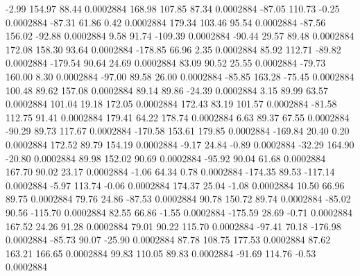        -2.99      154.97       88.44     0.0002884
      168.98      107.85       87.34     0.0002884
      -87.05      110.73       -0.25     0.0002884
      -87.31       61.86        0.42     0.0002884
      179.34      103.46       95.54     0.0002884
      -87.56      156.02      -92.88     0.0002884
        9.58       91.74     -109.39     0.0002884
      -90.44       29.57       89.48     0.0002884
      172.08      158.30       93.64     0.0002884
     -178.85       66.96        2.35     0.0002884
       85.92      112.71      -89.82     0.0002884
     -179.54       90.64       24.69     0.0002884
       83.09       90.52       25.55     0.0002884
      -79.73      160.00        8.30     0.0002884
      -97.00       89.58       26.00     0.0002884
      -85.85      163.28      -75.45     0.0002884
      100.48       89.62      157.08     0.0002884
       89.14       89.86      -24.39     0.0002884
        3.15       89.99       63.57     0.0002884
      101.04       19.18      172.05     0.0002884
      172.43       83.19      101.57     0.0002884
      -81.58      112.75       91.41     0.0002884
      179.41       64.22      178.74     0.0002884
        6.63       89.37       67.55     0.0002884
      -90.29       89.73      117.67     0.0002884
     -170.58      153.61      179.85     0.0002884
     -169.84       20.40        0.20     0.0002884
      172.52       89.79      154.19     0.0002884
       -9.17       24.84       -0.89     0.0002884
      -32.29      164.90      -20.80     0.0002884
       89.98      152.02       90.69     0.0002884
      -95.92       90.04       61.68     0.0002884
      167.70       90.02       23.17     0.0002884
       -1.06       64.34        0.78     0.0002884
     -174.35       89.53     -117.14     0.0002884
       -5.97      113.74       -0.06     0.0002884
      174.37       25.04       -1.08     0.0002884
       10.50       66.96       89.75     0.0002884
       79.76       24.86      -87.53     0.0002884
       90.78      150.72       89.74     0.0002884
      -85.02       90.56     -115.70     0.0002884
       82.55       66.86       -1.55     0.0002884
     -175.59       28.69       -0.71     0.0002884
      167.52       24.26       91.28     0.0002884
       79.01       90.22      115.70     0.0002884
      -97.41       70.18     -176.98     0.0002884
      -85.73       90.07      -25.90     0.0002884
       87.78      108.75      177.53     0.0002884
       87.62      163.21      166.65     0.0002884
       99.83      110.05       89.83     0.0002884
      -91.69      114.76       -0.53     0.0002884
